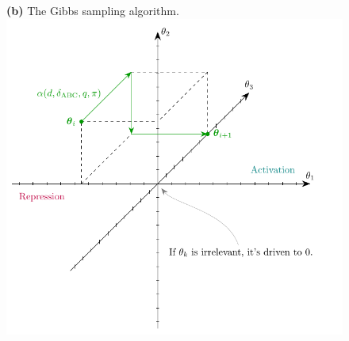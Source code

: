 \documentclass[border=10pt,varwidth=20cm]{standalone}
\begin{document}
\begin{minipage}[c]{0.5\textwidth}
   \begin{figure}[H]
      \vspace{0.3cm}
      {\large \textbf{(b)} The Gibbs sampling algorithm.}
      \vspace{0.3cm}
      \centering      
      \includegraphics[width=\textwidth]{panel2} 
   \end{figure}
\end{minipage}
\end{document}
